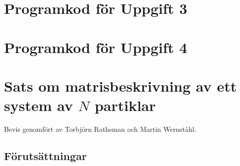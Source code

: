 \documentclass[12pt,a4paper]{article}
\begin{document}
	\begin{appendix}
	
		
		
		\section{Programkod för Uppgift 3}
			
			\begin{framed}
				
			\end{framed}
		
		\newpage
		
		\section{Programkod för Uppgift 4}
			
			\begin{framed}
				
			\end{framed}
	
	\newpage
	
\section{Sats om matrisbeskrivning av ett system av $N$ partiklar}
	
	\setcounter{equation}{0}
	
	Bevis genomfört av Torbjörn Rathsman och Martin Wernståhl.
	
	\subsection{Förutsättningar}
		\label{assumptions}
		

\end{appendix}
\end{document}

